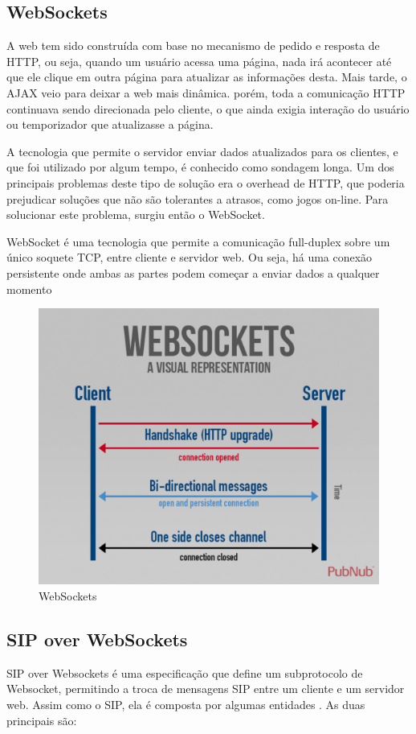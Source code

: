 \documentclass[12pt,a4paper,oneside]{report}
\begin{document}
\subsection{WebSockets}
\label{ss_webSockets}
A web tem sido construída com base no mecanismo de pedido e resposta de HTTP, ou seja, quando um usuário acessa uma página, nada irá acontecer até que ele clique em outra página para atualizar as informações desta. Mais tarde, o AJAX veio para deixar a web mais dinâmica. porém, toda a comunicação HTTP continuava sendo direcionada pelo cliente, o que ainda exigia interação do usuário ou  temporizador que atualizasse a página. 

A tecnologia que permite o servidor enviar dados atualizados para os clientes, e que foi utilizado por algum tempo, é conhecido como sondagem longa. Um dos principais problemas deste tipo de solução era o overhead de HTTP, que poderia prejudicar soluções que não são tolerantes a atrasos, como jogos on-line. Para solucionar este problema, surgiu então o WebSocket.

WebSocket é uma tecnologia que permite a comunicação full-duplex sobre um único soquete TCP, entre cliente e servidor web. Ou seja, há uma conexão persistente onde ambas as partes podem começar a enviar dados a qualquer momento

\begin{figure}[!htdb]
 \centering
  \includegraphics[width = 0.8\linewidth]{images/websocket}
  \caption{WebSockets} %
  \label{f_mediaStream}
\end{figure}

\subsection{SIP over WebSockets}
\label{ss_sipWebsockets}
SIP over Websockets é uma especificação que define um subprotocolo de Websocket, permitindo a troca de mensagens SIP entre um cliente e um servidor web. Assim como o SIP, ela é composta por algumas entidades \cite{Amaral:2013}. As duas principais são:
\end{document}
